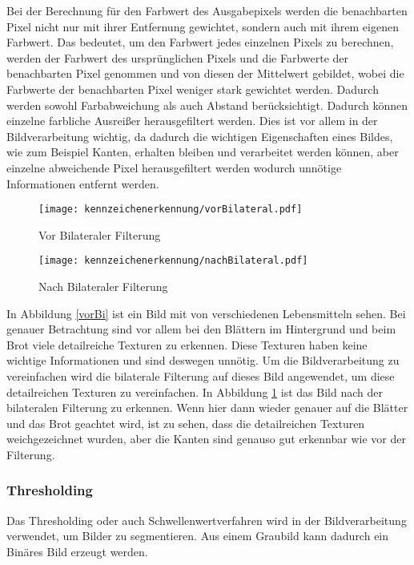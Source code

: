 Bei der Berechnung für den Farbwert des Ausgabepixels werden die benachbarten Pixel nicht nur 
mit ihrer Entfernung gewichtet, sondern auch mit ihrem eigenen Farbwert. Das bedeutet, um den Farbwert jedes einzelnen Pixels zu berechnen, 
werden der Farbwert des ursprünglichen Pixels und die Farbwerte der benachbarten Pixel genommen und von diesen der Mittelwert gebildet, wobei die Farbwerte der
benachbarten Pixel weniger stark gewichtet werden. Dadurch werden sowohl Farbabweichung als auch Abstand berücksichtigt. Dadurch können einzelne 
farbliche Ausreißer herausgefiltert werden. Dies ist vor allem in der Bildverarbeitung wichtig, 
da dadurch die wichtigen Eigenschaften eines Bildes, wie zum Beispiel Kanten, erhalten bleiben 
und verarbeitet werden können, aber einzelne abweichende Pixel herausgefiltert werden wodurch 
unnötige Informationen entfernt werden.\\ 

\begin{figure}[htbp]
    \centering
    \begin{minipage}[t]{0.45\linewidth}
        \centering
        \texttt{[image: kennzeichenerkennung/vorBilateral.pdf]}
        \caption{Vor Bilateraler Filterung}
        \label{vorBi}
    \end{minipage}
    \hfill
    \begin{minipage}[t]{0.45\linewidth}
        \centering
        \texttt{[image: kennzeichenerkennung/nachBilateral.pdf]}
        \caption{Nach Bilateraler Filterung}
        \label{nachBi}
    \end{minipage}
\end{figure}

In Abbildung \ref{vorBi} ist ein Bild mit von verschiedenen Lebensmitteln sehen. Bei genauer Betrachtung sind vor allem bei den Blättern im Hintergrund und beim Brot viele detailreiche Texturen zu erkennen. 
Diese Texturen haben keine wichtige Informationen und sind deswegen unnötig. Um die Bildverarbeitung zu 
vereinfachen wird die bilaterale Filterung auf dieses Bild angewendet, um diese detailreichen 
Texturen zu vereinfachen. In Abbildung \ref{nachBi} ist das Bild nach der bilateralen Filterung zu erkennen. 
Wenn hier dann wieder genauer auf die Blätter und das Brot geachtet wird, ist zu sehen, dass die 
detailreichen Texturen weichgezeichnet wurden, aber die Kanten sind genauso gut erkennbar wie vor der Filterung.

\subsubsection{Thresholding}
Das Thresholding oder auch Schwellenwertverfahren wird in der Bildverarbeitung verwendet, um Bilder zu segmentieren. 
Aus einem Graubild kann dadurch ein Binäres Bild erzeugt werden.\\ 

